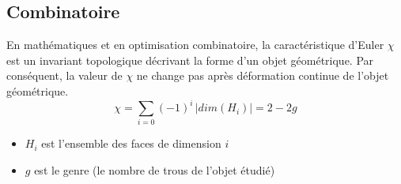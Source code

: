 \subsection{Combinatoire}
\noindent
En mathématiques et en optimisation combinatoire, la caractéristique d'Euler $\chi$ est un invariant topologique décrivant la forme d'un objet géométrique. Par conséquent, la valeur de $\chi$ ne change pas après déformation continue de l'objet géométrique.
\begin{equation}
\chi = \sum_{i=0} (-1)^i \, |dim(H_i)| = 2-2g
\end{equation}
\begin{itemize}
\item $H_i$ est l'ensemble des faces de dimension $i$
\item $g$ est le genre (le nombre de trous de l'objet étudié)
\end{itemize}

